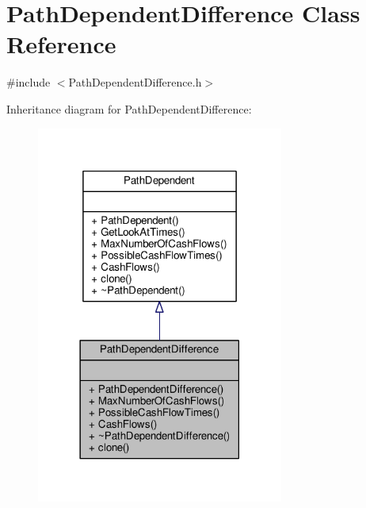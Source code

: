 \hypertarget{classPathDependentDifference}{}\section{Path\+Dependent\+Difference Class Reference}
\label{classPathDependentDifference}


{\ttfamily \#include $<$Path\+Dependent\+Difference.\+h$>$}



Inheritance diagram for Path\+Dependent\+Difference\+:
\nopagebreak
\begin{figure}[H]
\begin{center}
\leavevmode
\includegraphics[width=230pt]{classPathDependentDifference__inherit__graph}
\end{center}
\end{figure}



